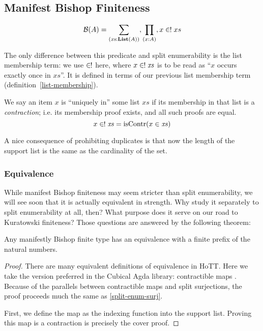 \subsection{Manifest Bishop Finiteness} \label{manifest-bishop}
\begin{definition}
  \begin{equation}
    \mathcal{B}(A) = \sum_{(\mathit{xs} : \textbf{List}(A))} , \prod_{(x : A)} , x \inunique xs
  \end{equation}
\end{definition}
The only difference between this predicate and split enumerability is the list
membership term: we use \(\inunique\) here, where \(x \inunique \mathit{xs}\) is
to be read as ``\(x\) occurs exactly once in \(\mathit{xs}\)''.
It is defined in terms of our previous list membership term
(definition~\ref{list-membership}).
\begin{definition}
  We say an item \(x\) is ``uniquely in'' some list \(\mathit{xs}\) if its
  membership in that list is a \emph{contraction}; i.e. its membership proof
  exists, and all such proofs are equal.
  \begin{equation}
    x \inunique \mathit{xs} = \text{isContr}(x \in \mathit{xs})
  \end{equation}
\end{definition}

A nice consequence of prohibiting duplicates is that now the length of the
support list is the same as the cardinality of the set.
\subsubsection{Equivalence}
While manifest Bishop finiteness may seem stricter than split enumerability, we
will see soon that it is actually equivalent in strength.
Why study it separately to split enumerability at all, then?
What purpose does it serve on our road to Kuratowski finiteness?
Those questions are answered by the following theorem:
\begin{lemma} \label{bishop-equiv}
  Any manifestly Bishop finite type has an equivalence with a finite prefix of
  the natural numbers.
\end{lemma}
\begin{proof}
  There are many equivalent definitions of equivalence in HoTT.
  Here we take the version preferred in the Cubical Agda library: contractible
  maps \cite[Definition~4.4.1]{hottbook}. 
  Because of the parallels between contractible maps and split surjections,
  the proof proceeds much the same as \ref{split-enum-surj}.

  First, we define the map as the indexing function into the support list.
  Proving this map is a contraction is precisely the cover proof.

\end{proof}

